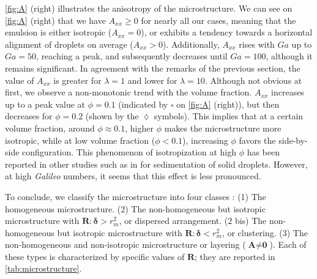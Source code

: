 \ref{fig:A} (right) illustrates the anisotropy of the microstructure. We can see on \ref{fig:A} (right) that we have $A_{xx} \ge 0$ for nearly all our cases, meaning that the emulsion is either isotropic ($A_{xx} = 0$), or exhibits a tendency towards a horizontal alignment of droplets on average ($A_{xx} >0$). %
Additionally, $A_{xx}$ rises with $Ga$ up to $Ga = 50$, reaching a peak, and subsequently decreases until $Ga = 100$, although it remains significant.
In agreement with the remarks of the previous section, the value of $A_{xx}$ is greater for $\lambda = 1$ and lower for  $\lambda = 10$.
Although not obvious at first, we observe a non-monotonic trend with the volume fraction. $A_{xx}$ increases up to a peak value at $\phi = 0.1$ (indicated by \textcolor{col3}{$\pmb\square$} on \ref{fig:A} (right)), but then decreases for $\phi=0.2$ (shown by the \textcolor{col4}{$\pmb\lozenge$} symbols). %
This implies that at a certain volume fraction, around $\phi \approx 0.1$, higher $\phi$ makes the microstructure more isotropic, while at low volume fraction ($\phi < 0.1$), increasing $\phi$ favors the side-by-side configuration.
This phenomenon of isotropization at high $\phi$ has been reported in other studies such as in \citet{seyed2021sedimentation} for sedimentation of solid droplets. 
However, at high \textit{Galileo} numbers, it seems that this effect is less pronounced. 


To conclude, we classify the microstructure into four classes :
(1) The homogeneous microstructure.
(2) The non-homogeneous but isotropic microstructure with $\textbf{R}:\bm\delta > r_m^2$, or dispersed arrangement. %
(2 bis) The non-homogeneous but isotropic microstructure with $\textbf{R}:\bm\delta < r_m^2$, or clustering. 
(3) The non-homogeneous and non-isotropic microstructure or layering ($\textbf{A}\neq \textbf{0}$). 
Each of these types is characterized by specific values of $\textbf{R}$; they are reported in \ref{tab:microstructure}. 

